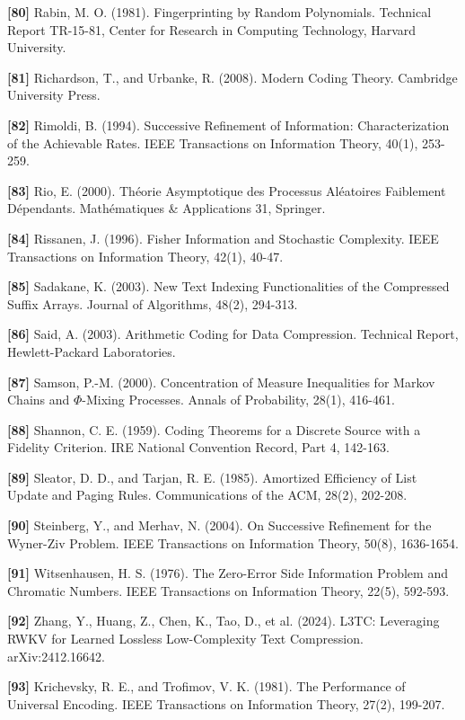 \documentclass[
]{article}
\begin{document}
\textbf{{[}80{]}} Rabin, M. O. (1981). Fingerprinting by Random
Polynomials. Technical Report TR-15-81, Center for Research in Computing
Technology, Harvard University.

\textbf{{[}81{]}} Richardson, T., and Urbanke, R. (2008). Modern Coding
Theory. Cambridge University Press.

\textbf{{[}82{]}} Rimoldi, B. (1994). Successive Refinement of
Information: Characterization of the Achievable Rates. IEEE Transactions
on Information Theory, 40(1), 253-259.

\textbf{{[}83{]}} Rio, E. (2000). Th\'eorie Asymptotique des Processus
Al\'eatoires Faiblement D\'ependants. Math\'ematiques \& Applications 31,
Springer.

\textbf{{[}84{]}} Rissanen, J. (1996). Fisher Information and
Stochastic Complexity. IEEE Transactions on Information Theory, 42(1),
40-47.

\textbf{{[}85{]}} Sadakane, K. (2003). New Text Indexing Functionalities
of the Compressed Suffix Arrays. Journal of Algorithms, 48(2), 294-313.

\textbf{{[}86{]}} Said, A. (2003). Arithmetic Coding for Data
Compression. Technical Report, Hewlett-Packard Laboratories.

\textbf{{[}87{]}} Samson, P.-M. (2000). Concentration of Measure
Inequalities for Markov Chains and $\Phi$-Mixing Processes. Annals of
Probability, 28(1), 416-461.

\textbf{{[}88{]}} Shannon, C. E. (1959). Coding Theorems for a Discrete
Source with a Fidelity Criterion. IRE National Convention Record, Part 4,
142-163.

\textbf{{[}89{]}} Sleator, D. D., and Tarjan, R. E. (1985). Amortized
Efficiency of List Update and Paging Rules. Communications of the ACM,
28(2), 202-208.

\textbf{{[}90{]}} Steinberg, Y., and Merhav, N. (2004). On Successive
Refinement for the Wyner-Ziv Problem. IEEE Transactions on Information
Theory, 50(8), 1636-1654.

\textbf{{[}91{]}} Witsenhausen, H. S. (1976). The Zero-Error Side
Information Problem and Chromatic Numbers. IEEE Transactions on
Information Theory, 22(5), 592-593.

\textbf{{[}92{]}} Zhang, Y., Huang, Z., Chen, K., Tao, D., et al.
(2024). L3TC: Leveraging RWKV for Learned Lossless Low-Complexity Text
Compression. arXiv:2412.16642.

\textbf{{[}93{]}} Krichevsky, R. E., and Trofimov, V. K. (1981). The
Performance of Universal Encoding. IEEE Transactions on Information
Theory, 27(2), 199-207.
\end{document}
